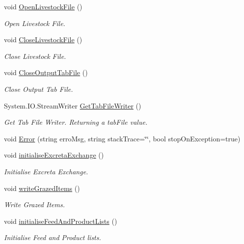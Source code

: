 \begin{DoxyCompactItemize}
void \mbox{\hyperlink{class_global_vars_a67d8101f65e6a06b48e4ee6f98648bc1}{Open\+Livestock\+File}} ()
\begin{DoxyCompactList}\small\item\em Open Livestock File. \end{DoxyCompactList}\item 
void \mbox{\hyperlink{class_global_vars_a47f3bf61f5820b930434a3f79ab6347a}{Close\+Livestock\+File}} ()
\begin{DoxyCompactList}\small\item\em Close Livestock File. \end{DoxyCompactList}\item 
void \mbox{\hyperlink{class_global_vars_a882bf1b637aa2839079ca14e90c50af8}{Close\+Output\+Tab\+File}} ()
\begin{DoxyCompactList}\small\item\em Close Output Tab File. \end{DoxyCompactList}\item 
System.\+I\+O.\+Stream\+Writer \mbox{\hyperlink{class_global_vars_ae46e7193670046608e26f2342ce6287d}{Get\+Tab\+File\+Writer}} ()
\begin{DoxyCompactList}\small\item\em Get Tab File Writer. Returning a tab\+File value. \end{DoxyCompactList}\item 
void \mbox{\hyperlink{class_global_vars_a2a6f1b6e75e0925726a16d292525841e}{Error}} (string erro\+Msg, string stack\+Trace=\char`\"{}\char`\"{}, bool stop\+On\+Exception=true)
\item 
void \mbox{\hyperlink{class_global_vars_ac5574c4c8e6b42592e74966bd08e5b9f}{initialise\+Excreta\+Exchange}} ()
\begin{DoxyCompactList}\small\item\em Initialise Excreta Exchange. \end{DoxyCompactList}\item 
void \mbox{\hyperlink{class_global_vars_a98c292c18939cf158a65aa68f9abdb07}{write\+Grazed\+Items}} ()
\begin{DoxyCompactList}\small\item\em Write Grazed Items. \end{DoxyCompactList}\item 
void \mbox{\hyperlink{class_global_vars_af10abdb4f5f605edc5d550ec70e38b56}{initialise\+Feed\+And\+Product\+Lists}} ()
\begin{DoxyCompactList}\small\item\em Initialise Feed and Product lists. \end{DoxyCompactList}\item 

\end{DoxyCompactItemize}
